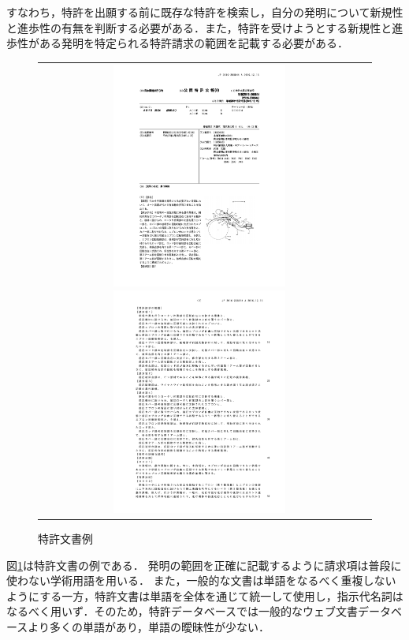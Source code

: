 \documentclass[master]{suribt}
\theoremstyle{definition}
\begin{document}
 すなわち，特許を出願する前に既存な特許を検索し，自分の発明について新規性と進歩性の有無を判断する必要がある．また，特許を受けようとする新規性と進歩性がある発明を特定られる特許請求の範囲を記載する必要がある．
 \begin{figure}
  \hspace*{-2cm}
  \begin{tabular}{cc}
  \includegraphics[width=0.55\textwidth,natwidth=500,natheight=1100]{ex1-1.pdf}
  \includegraphics[width=0.55\textwidth,natwidth=500,natheight=1100]{ex1-2.pdf}
  \end{tabular}
  \caption{特許文書例}
  \label{fig:exp}
 \end{figure}

 図\ref{fig:exp}は特許文書の例である．
 発明の範囲を正確に記載するように請求項は普段に使わない学術用語を用いる． また，一般的な文書は単語をなるべく重複しないようにする一方，特許文書は単語を全体を通じて統一して使用し，指示代名詞はなるべく用いず．そのため，特許データベースでは一般的なウェブ文書データベースより多くの単語があり，単語の曖昧性が少ない．
 
\end{document}
